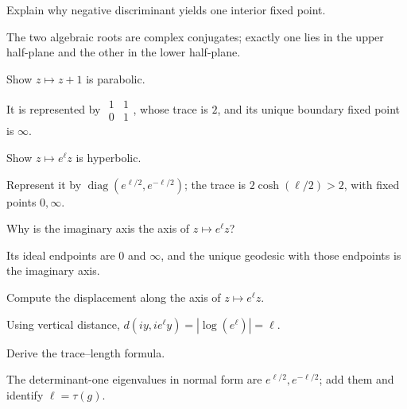 \begin{problem}\label{prob:vii34-02}
Explain why negative discriminant yields one interior fixed point.
\end{problem}
\begin{solution}
The two algebraic roots are complex conjugates; exactly one lies in the upper half-plane and the other in the lower half-plane.
\end{solution}

\begin{problem}\label{prob:vii34-03}
Show \(z\mapsto z+1\) is parabolic.
\end{problem}
\begin{solution}
It is represented by \(\begin{smallmatrix}1&1\\0&1\end{smallmatrix}\), whose trace is \(2\), and its unique boundary fixed point is \(\infty\).
\end{solution}

\begin{problem}\label{prob:vii34-04}
Show \(z\mapsto e^\ell z\) is hyperbolic.
\end{problem}
\begin{solution}
Represent it by \(\operatorname{diag}(e^{\ell/2},e^{-\ell/2})\); the trace is \(2\cosh(\ell/2)>2\), with fixed points \(0,\infty\).
\end{solution}

\begin{problem}\label{prob:vii34-05}
Why is the imaginary axis the axis of \(z\mapsto e^\ell z\)?
\end{problem}
\begin{solution}
Its ideal endpoints are \(0\) and \(\infty\), and the unique geodesic with those endpoints is the imaginary axis.
\end{solution}

\begin{problem}\label{prob:vii34-06}
Compute the displacement along the axis of \(z\mapsto e^\ell z\).
\end{problem}
\begin{solution}
Using vertical distance, \(d(iy,ie^\ell y)=|\log(e^\ell)|=\ell\).
\end{solution}

\begin{problem}\label{prob:vii34-07}
Derive the trace--length formula.
\end{problem}
\begin{solution}
The determinant-one eigenvalues in normal form are \(e^{\ell/2},e^{-\ell/2}\); add them and identify \(\ell=\tau(g)\).
\end{solution}

